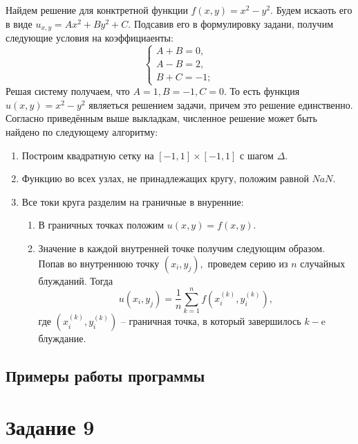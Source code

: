 \documentclass[11pt]{article}
\numberwithin{equation}{section}
\begin{document}
Найдем решение для конктретной функции $f(x,y) = x^2 - y^2.$ Будем искаоть его в виде
$u_{x,y} = Ax^2+By^2+C.$ Подсавив его в формулировку задани, получим 
следующие условия на коэффициаенты:
\begin{equation*}
  \begin{cases}
    A+B =  0, \\
    A-B = 2, \\
    B+C = -1;
  \end{cases}
\end{equation*}
Решая систему получаем, что $A = 1, B = -1, C=0.$ То есть функция $u(x,y) = x^2-y^2$ 
являеться решением задачи, причем это решение единственно.
Согласно приведённым выше выкладкам, численное решение может быть найдено по следующему алгоритму:
\begin{enumerate}
  \item Построим квадратную сетку на $[-1,1] \times [-1, 1]$ с шагом $\Delta.$
  \item Функцию во всех узлах, не принадлежащих кругу, положим равной $NaN.$
  \item Все токи круга разделим на граничные в внуренние:
  \begin{enumerate}
    \item В граничных точках положим $u(x,y) = f(x,y).$
    \item Значение в каждой внутренней точке получим следующим образом. Попав во
    внутреннюю точку $(x_i, y_j),$ проведем серию из $n$ случайных блужданий. Тогда
    $$u(x_i, y_j) = \frac{1}{n} \sum_{k=1}^{n} f(x_i^{(k)},y_i^{(k)}),$$
    где $(x_i^{(k)},y_i^{(k)})$ -- граничная точка, в который завершилось $k-$e блуждание.
  \end{enumerate}
\end{enumerate}
\subsection{Примеры работы программы}
\section{Задание 9}
\end{document}
